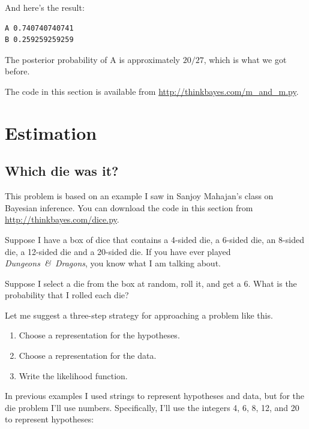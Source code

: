 \documentclass[12pt]{book}
\begin{document}
And here's the result:

\begin{verbatim}
A 0.740740740741
B 0.259259259259
\end{verbatim}

The posterior probability of A is approximately $20/27$, which
is what we got before.

The code in this section is available from
\url{http://thinkbayes.com/m_and_m.py}.



\chapter{Estimation}
\label{estimation}

\section{Which die was it?}

This problem is based on an example I saw in Sanjoy Mahajan's class on
Bayesian inference.  You can download the code in this section from
\url{http://thinkbayes.com/dice.py}.

Suppose I have a box of dice that contains a 4-sided die, a 6-sided
die, an 8-sided die, a 12-sided die and a 20-sided die.  If you
have ever played {\it Dungeons~\&~Dragons}, you know what I am talking about.

Suppose I select a die from the box at random, roll it, and get a 6.
What is the probability that I rolled each die?

Let me suggest a three-step strategy for approaching a problem like this.

\begin{enumerate}

\item Choose a representation for the hypotheses.

\item Choose a representation for the data.

\item Write the likelihood function.

\end{enumerate}

In previous examples I used strings to represent hypotheses and
data, but for the die problem I'll use numbers.  Specifically,
I'll use the integers 4, 6, 8, 12, and 20 to represent hypotheses:
\end{document}
